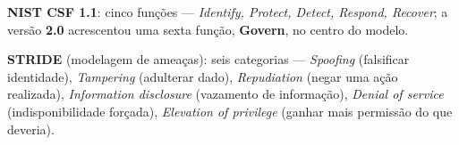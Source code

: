 \begin{conceito}
\textbf{NIST CSF 1.1}: cinco funções --- \textit{Identify, Protect,
Detect, Respond, Recover}; a versão \textbf{2.0} acrescentou uma sexta
função, \textbf{Govern}, no centro do modelo.

\textbf{STRIDE} (modelagem de ameaças): seis categorias --- \textit{
Spoofing} (falsificar identidade), \textit{Tampering} (adulterar dado),
\textit{Repudiation} (negar uma ação realizada), \textit{Information
disclosure} (vazamento de informação), \textit{Denial of service}
(indisponibilidade forçada), \textit{Elevation of privilege} (ganhar
mais permissão do que deveria).
\end{conceito}
